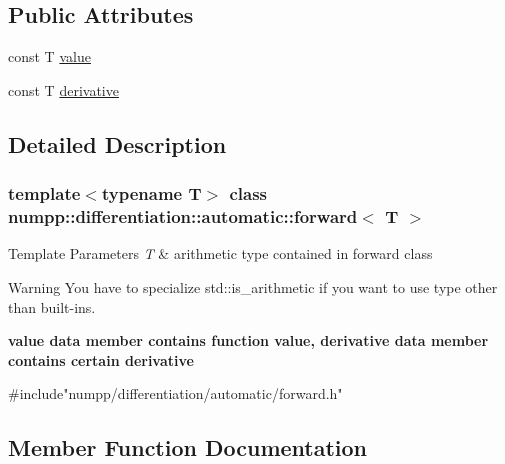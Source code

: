 \subsection*{Public Attributes}
\begin{DoxyCompactItemize}
\item 
const T \hyperlink{classnumpp_1_1differentiation_1_1automatic_1_1forward_a64a2339eab5772de4da0483fd5c4f895}{value}
\item 
const T \hyperlink{classnumpp_1_1differentiation_1_1automatic_1_1forward_abcaca75164fca6c9d423d6b11b5517e9}{derivative}
\end{DoxyCompactItemize}


\subsection{Detailed Description}
\subsubsection*{template$<$typename T$>$\newline
class numpp\+::differentiation\+::automatic\+::forward$<$ T $>$}


\begin{DoxyTemplParams}{Template Parameters}
{\em T} & arithmetic type contained in forward class \\
\hline
\end{DoxyTemplParams}
\begin{DoxyWarning}{Warning}
You have to specialize std\+::is\+\_\+arithmetic if you want to use type other than built-\/ins.
\end{DoxyWarning}
{\bfseries  value data member contains function value, derivative data member contains certain derivative }


\begin{DoxyCode}
\textcolor{preprocessor}{#include"numpp/differentiation/automatic/forward.h"}
\end{DoxyCode}
 

\subsection{Member Function Documentation}
\mbox{\label{classnumpp_1_1differentiation_1_1automatic_1_1forward_a006d157f743938e11eb54668c41da769}} 
